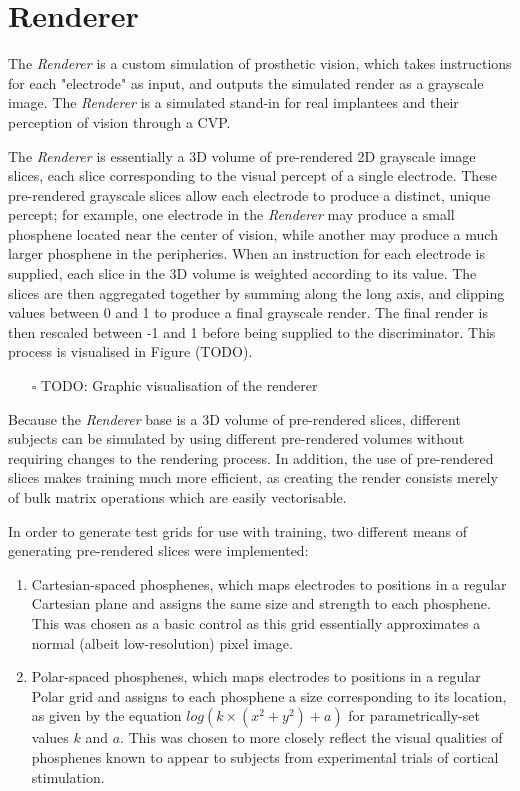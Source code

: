 \documentclass[11pt]{book}
\begin{document}
\section*{Renderer}
\label{sec:org0633bed}

The \emph{Renderer} is a custom simulation of prosthetic vision, which takes instructions for each "electrode" as input, and outputs the simulated render as a grayscale image.
The \emph{Renderer} is a simulated stand-in for real implantees and their perception of vision through a CVP.

The \emph{Renderer} is essentially a 3D volume of pre-rendered 2D grayscale image slices, each slice corresponding to the visual percept of a single electrode.
These pre-rendered grayscale slices allow each electrode to produce a distinct, unique percept; for example, one electrode in the \emph{Renderer} may produce a small phosphene located near the center of vision, while another may produce a much larger phosphene in the peripheries.
When an instruction for each electrode is supplied, each slice in the 3D volume is weighted according to its value.
The slices are then aggregated together by summing along the long axis, and clipping values between 0 and 1 to produce a final grayscale render.
The final render is then rescaled between -1 and 1 before being supplied to the discriminator.
This process is visualised in Figure (TODO).

\begin{itemize}
\item[{$\square$}] TODO: Graphic visualisation of the renderer
\end{itemize}

Because the \emph{Renderer} base is a 3D volume of pre-rendered slices, different subjects can be simulated by using different pre-rendered volumes without requiring changes to the rendering process.
In addition, the use of pre-rendered slices makes training much more efficient, as creating the render consists merely of bulk matrix operations which are easily vectorisable.

In order to generate test grids for use with training, two different means of generating pre-rendered slices were implemented:
\begin{enumerate}
\item Cartesian-spaced phosphenes, which maps electrodes to positions in a regular Cartesian plane and assigns the same size and strength to each phosphene.
This was chosen as a basic control as this grid essentially approximates a normal (albeit low-resolution) pixel image.
\item Polar-spaced phosphenes, which maps electrodes to positions in a regular Polar grid and assigns to each phosphene a size corresponding to its location, as given by the equation \(log(k \times (x^2 + y^2) + a)\) for parametrically-set values \(k\) and \(a\).
This was chosen to more closely reflect the visual qualities of phosphenes known to appear to subjects from experimental trials of cortical stimulation.
\end{enumerate}
\end{document}

